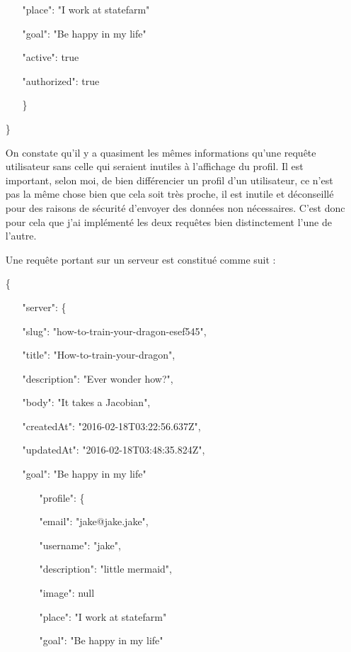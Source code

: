 \documentclass{article}
\begin{document}
\begin{itemize}
\begin{itemize}
			\item[]"place": "I work at statefarm"
			\item[]"goal": "Be happy in my life"
			\item[]"active": true
			\item[]"authorized": true
		\item[\}]
	\end{itemize}
	\item[\}]
	\item[]On constate qu'il y a quasiment les mêmes informations qu'une requête utilisateur sans celle qui seraient inutiles à l'affichage du profil. Il est important, selon moi, de bien différencier un profil d'un utilisateur, ce n'est pas la même chose bien que cela soit très proche, il est inutile et déconseillé pour des raisons de sécurité d'envoyer des données non nécessaires. C'est donc pour cela que j'ai implémenté les deux requêtes bien distinctement l'une de l'autre.
	\item[]
	\item[]Une requête portant sur un serveur est constitué comme suit :
	\item[\{]
	\item[]
	\begin{itemize}
		\item["server": \{]
			\item[]"slug": "how-to-train-your-dragon-esef545",
			\item[]"title": "How-to-train-your-dragon",
			\item[]"description": "Ever wonder how?",
			\item[]"body": "It takes a Jacobian",
			\item[]"createdAt": "2016-02-18T03:22:56.637Z",
			\item[]"updatedAt": "2016-02-18T03:48:35.824Z",
			\item[]"goal": "Be happy in my life"
			\item[]
			\begin{itemize}
				\item["profile": \{]
					\item[]"email": "jake@jake.jake",
					\item[]"username": "jake",
					\item[]"description": "little mermaid",
					\item[]"image": null
					\item[]"place": "I work at statefarm"
					\item[]"goal": "Be happy in my life"

\end{itemize}
\end{itemize}
\end{itemize}
\end{document}
